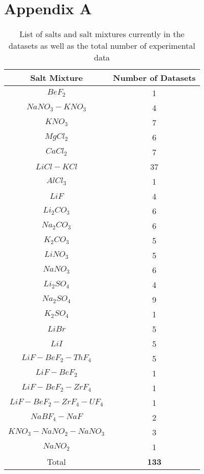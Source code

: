 \section*{Appendix A}
\setcounter{table}{0}
\renewcommand{\thetable}{A\arabic{table}}

\begin{table}[h]
    \centering
    \caption{List of salts and salt mixtures currently in the datasets as well as the total number of experimental data}
    \begin{tabular}{c|c}
    Salt Mixture     & Number of Datasets  \\ \hline
    $BeF_2$     & 1 \\
    $NaNO_3-KNO_3$ & 4 \\
    $KNO_3$ & 7 \\
    $MgCl_2$ & 6 \\
    $CaCl_2$ & 7 \\
    $LiCl-KCl$ & 37 \\
    $AlCl_3$ & 1 \\
    $LiF$ & 4 \\
    $Li_2CO_3$ & 6 \\
    $Na_2CO_3$ & 6 \\
    $K_2CO_3$ & 5 \\
    $LiNO_3$ & 5 \\
    $NaNO_3$ & 6 \\
    $Li_2SO_4$ & 4 \\
    $Na_2SO_4$ & 9 \\
    $K_2SO_4$ & 1 \\
    $LiBr$ & 5 \\
    $LiI$ & 5 \\
    $LiF-BeF_2-ThF_4$ & 5 \\
    $LiF-BeF_2$ & 1 \\
    $LiF-BeF_2-ZrF_4$ & 1 \\
    $LiF-BeF_2-ZrF_4-UF_4$ & 1 \\
    $NaBF_4-NaF$ & 2 \\
    $KNO_3-NaNO_2-NaNO_3$ & 3 \\
    $NaNO_2$ & 1 \\
    \hline
     Total & \textbf{133} \\
    \end{tabular}
    \label{tab:listofSalts}
\end{table}
